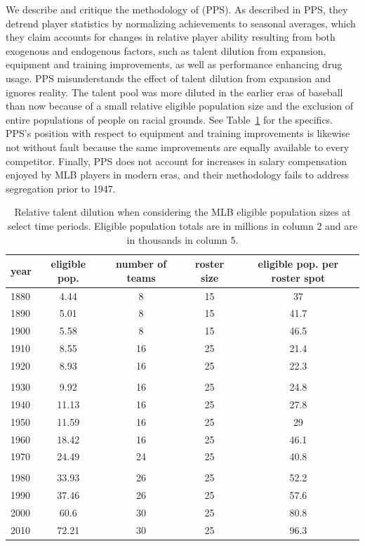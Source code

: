 \documentclass[11pt]{article}\usepackage[]{graphicx}\usepackage[]{color}
\begin{document}
We describe and critique the methodology of \citet{petersen} (PPS). 
As described in PPS, they detrend player statistics by normalizing 
achievements to seasonal averages, which they claim accounts for changes in 
relative player ability resulting from both exogenous and endogenous factors, 
such as 
talent dilution from expansion, 
equipment and training improvements, 
as well as performance enhancing drug usage. 
PPS misunderstands the effect of talent dilution from expansion and ignores 
reality.  The talent pool was more diluted in the earlier eras of 
baseball than now because of a small relative eligible population size and 
the exclusion of entire populations of people on racial grounds.  
See Table~\ref{dilution} for the specifics.  PPS's position with respect 
to equipment and training improvements is likewise not without fault 
because the same improvements are equally available to every competitor.  
Finally, PPS does not account for increases in salary compensation enjoyed by 
MLB players in modern eras, and their methodology fails to address 
segregation prior to 1947.


\begin{table}[h!]
\begin{center}
\begin{tabular}{lcccc}
\hline
year & eligible pop. & number of teams & roster size & eligible pop. per roster spot \\
\hline
1880 & 4.44  & 8  & 15 & 37   \\
1890 & 5.01  & 8  & 15 & 41.7   \\
1900 & 5.58  & 8  & 15 & 46.5   \\
1910 & 8.55  & 16 & 25 & 21.4  \\
1920 & 8.93  & 16 & 25 & 22.3  \\
  & & & &  \\
1930 & 9.92  & 16 & 25 & 24.8  \\
1940 & 11.13  & 16 & 25 & 27.8  \\
1950 & 11.59  & 16 & 25 & 29  \\
1960 & 18.42  & 16 & 25 & 46.1  \\
1970 & 24.49  & 24 & 25 & 40.8  \\
  & & & &  \\
1980 & 33.93 & 26 & 25 & 52.2 \\
1990 & 37.46 & 26 & 25 & 57.6 \\
2000 & 60.6 & 30 & 25 & 80.8 \\
2010 & 72.21 & 30 & 25 & 96.3 \\
\hline
\end{tabular}
\end{center}
\caption{Relative talent dilution when considering the MLB eligible population 
  sizes at select time periods. Eligible population totals are in millions in 
  column 2 and are in thousands in column 5. }
\label{dilution}
\end{table}
\end{document}
